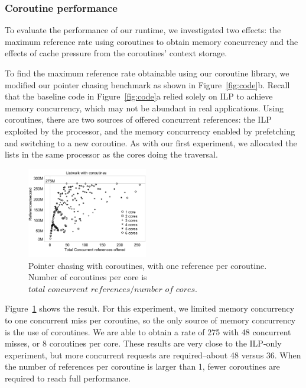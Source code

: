 \documentclass[10pt,nocopyrightspace,preprint]{sigplanconf}
\begin{document}
\subsubsection{Coroutine performance}

To evaluate the performance of our runtime, we investigated two
effects: the maximum reference rate using coroutines
to obtain memory concurrency and the effects of cache pressure from the
coroutines' context storage. 

To find the maximum reference rate obtainable using our coroutine
library, we modified our pointer chasing benchmark as shown in
Figure~\ref{fig:code}b. Recall that the baseline code in Figure~\ref{fig:code}a relied solely on ILP to achieve memory concurrency, which may not be abundant in real applications. Using coroutines, there are two sources of offered
concurrent references: the ILP exploited by the processor, and the
memory concurrency enabled by prefetching and switching to a new
coroutine. As with our first experiment, we allocated the lists in the
same processor as the cores doing the traversal. 

\begin{figure}[t]
  \begin{center}
    \includegraphics[width=0.47\textwidth]{figures/multi-green-edited.pdf}
  \end{center}
  \caption{Pointer chasing with coroutines, with one reference per
    coroutine. Number of coroutines per core is $\textit{total concurrent references} / \textit{number of cores}$.}
  \label{fig:multi-green}
\end{figure}

Figure~\ref{fig:multi-green} shows the result. For this
experiment, we limited memory concurrency to one concurrent miss per
coroutine, so the only source of memory concurrency is the use of
coroutines. We are able to obtain a rate of 275 \mrps with 48 concurrent misses, or 8 coroutines per core. These
results are very close to the ILP-only experiment, but more concurrent requests are required--about 48 versus 36. When the number of references per coroutine is larger than 1, fewer coroutines are required to reach full performance.
\end{document}
